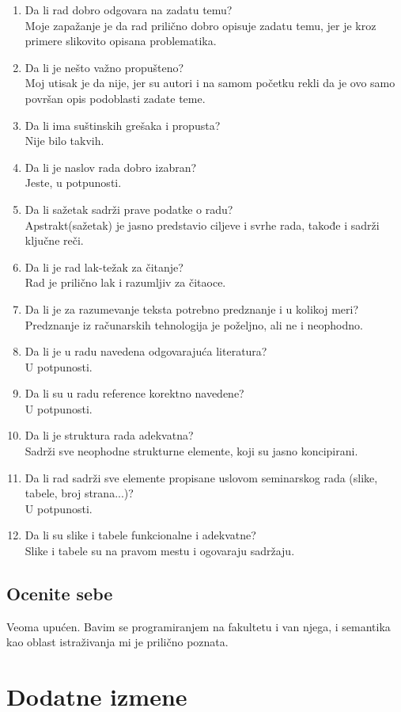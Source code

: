 \documentclass[a4paper]{report}
\begin{document}
\begin{enumerate}
\item Da li rad dobro odgovara na zadatu temu?\\
Moje zapažanje je da rad prilično dobro opisuje zadatu temu, jer je kroz primere slikovito opisana problematika. 
\item Da li je nešto važno propušteno?\\
Moj utisak je da nije, jer su autori i na samom početku rekli da je ovo samo površan opis podoblasti zadate teme.
\item Da li ima suštinskih grešaka i propusta?\\
Nije bilo takvih.
\item Da li je naslov rada dobro izabran?\\
Jeste, u potpunosti.
\item Da li sažetak sadrži prave podatke o radu?\\
Apstrakt(sažetak) je jasno predstavio ciljeve i svrhe rada, takođe i sadrži ključne reči.
\item Da li je rad lak-težak za čitanje?\\
Rad je prilično lak i razumljiv za čitaoce.
\item Da li je za razumevanje teksta potrebno predznanje i u kolikoj meri?\\
Predznanje iz računarskih tehnologija je poželjno, ali ne i neophodno. 
\item Da li je u radu navedena odgovarajuća literatura?\\
U potpunosti.
\item Da li su u radu reference korektno navedene?\\
U potpunosti.
\item Da li je struktura rada adekvatna?\\
Sadrži sve neophodne strukturne elemente, koji su jasno koncipirani.
\item Da li rad sadrži sve elemente propisane uslovom seminarskog rada (slike, tabele, broj strana...)?\\
U potpunosti.
\item Da li su slike i tabele funkcionalne i adekvatne?\\
Slike i tabele su na pravom mestu i ogovaraju sadržaju.
\end{enumerate}

\section{Ocenite sebe}
Veoma upućen. Bavim se programiranjem na fakultetu i van njega, i semantika kao oblast istraživanja mi je prilično poznata.


\chapter{Dodatne izmene}
\end{document}
